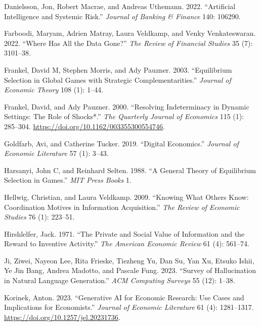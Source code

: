 \documentclass[
]{article}
\newlength{\cslhangindent}
\newenvironment{CSLReferences}[2] %
 {\begin{list}{}{%
  \setlength{\itemindent}{0pt}
  \setlength{\leftmargin}{0pt}
  \setlength{\parsep}{0pt}
  \ifodd #1
   \setlength{\leftmargin}{\cslhangindent}
   \setlength{\itemindent}{-1\cslhangindent}
  \fi
  \setlength{\itemsep}{#2\baselineskip}}}
 {\end{list}}
\theoremstyle{plain}
\theoremstyle{remark}
\begin{document}
\begin{CSLReferences}{1}{0}
Danielsson, Jon, Robert Macrae, and Andreas Uthemann. 2022.
{``Artificial Intelligence and Systemic Risk.''} \emph{Journal of
Banking \& Finance} 140: 106290.

Farboodi, Maryam, Adrien Matray, Laura Veldkamp, and Venky
Venkateswaran. 2022. {``Where Has All the Data Gone?''} \emph{The Review
of Financial Studies} 35 (7): 3101--38.

Frankel, David M, Stephen Morris, and Ady Pauzner. 2003. {``Equilibrium
Selection in Global Games with Strategic Complementarities.''}
\emph{Journal of Economic Theory} 108 (1): 1--44.

Frankel, David, and Ady Pauzner. 2000. {``{Resolving Indeterminacy in
Dynamic Settings: The Role of Shocks*}.''} \emph{The Quarterly Journal
of Economics} 115 (1): 285--304.
\url{https://doi.org/10.1162/003355300554746}.

Goldfarb, Avi, and Catherine Tucker. 2019. {``Digital Economics.''}
\emph{Journal of Economic Literature} 57 (1): 3--43.

Harsanyi, John C, and Reinhard Selten. 1988. {``A General Theory of
Equilibrium Selection in Games.''} \emph{MIT Press Books} 1.

Hellwig, Christian, and Laura Veldkamp. 2009. {``Knowing What Others
Know: Coordination Motives in Information Acquisition.''} \emph{The
Review of Economic Studies} 76 (1): 223--51.

Hirshlelfer, Jack. 1971. {``The Private and Social Value of Information
and the Reward to Inventive Activity.''} \emph{The American Economic
Review} 61 (4): 561--74.

Ji, Ziwei, Nayeon Lee, Rita Frieske, Tiezheng Yu, Dan Su, Yan Xu, Etsuko
Ishii, Ye Jin Bang, Andrea Madotto, and Pascale Fung. 2023. {``Survey of
Hallucination in Natural Language Generation.''} \emph{ACM Computing
Surveys} 55 (12): 1--38.

Korinek, Anton. 2023. {``Generative AI for Economic Research: Use Cases
and Implications for Economists.''} \emph{Journal of Economic
Literature} 61 (4): 1281--1317.
\url{https://doi.org/10.1257/jel.20231736}.


\end{CSLReferences}
\end{document}
